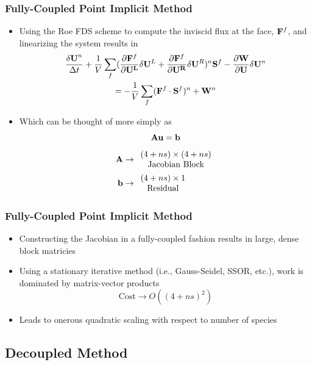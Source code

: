 \documentclass{beamer}
\begin{document}
\begin{frame}
  \frametitle{Fully-Coupled Point Implicit Method}
  \begin{itemize}
  \item Using the Roe FDS scheme to compute the inviscid flux at the face,
    $\mathbf F^f$, and linearizing the system results in
  \begin{multline*}
  	\frac{\mathbf{\delta U}^n}{\Delta t}
    +\frac{1}{V}\sum\limits_{f}(\frac{\partial \mathbf F^f}
    {\partial \mathbf{U^L}}\delta\mathbf U^L
  	+\frac{\partial \mathbf F^f}{\partial \mathbf{U^R}}\delta\mathbf U^R)^n \mathbf S^f
  	- \frac{\partial \mathbf W}{\partial \mathbf U}\delta\mathbf U^n \\
  	= -\frac{1}{V}\sum\limits_{f}(\mathbf F^f\cdot\mathbf S^f)^n + \mathbf W^n
  \end {multline*}
  \item Which can be thought of more simply as
  \[
    \mathbf A\mathbf u = \mathbf b
  \]
  \begin{align*}
    \mathbf A &\to
    \begin{array}{c}
      (4+ns) \times (4+ns) \\
      \text{Jacobian Block}
    \end{array} \\
    \mathbf b &\to
    \begin{array}{c}
      (4+ns) \times 1 \\
      \text{Residual}
    \end{array}
  \end{align*}
  \end{itemize}
\end{frame}
\begin{frame}
  \frametitle{Fully-Coupled Point Implicit Method}
  \begin{itemize}
    \item Constructing the Jacobian in a fully-coupled fashion results in large,
      dense block matricies
    \item Using a stationary iterative method (i.e., Gauss-Seidel, SSOR, etc.),
      work is dominated by matrix-vector products
      \[
        \text{Cost} \to O((4+ns)^2)
      \]
    \item Leads to onerous quadratic scaling with respect to number of species
  \end{itemize}
\end{frame}

\subsection{Decoupled Method}
\end{document}
